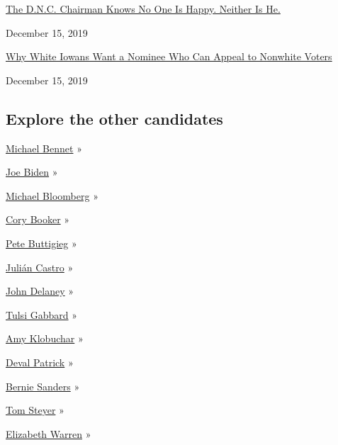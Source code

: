 \href{https://www.nytimes.com/2019/12/15/us/politics/democrats-2020-tom-perez.html}{The
D.N.C. Chairman Knows No One Is Happy. Neither Is He.}

December 15, 2019

\href{https://www.nytimes.com/2019/12/15/us/politics/iowa-2020-candidates.html}{Why
White Iowans Want a Nominee Who Can Appeal to Nonwhite Voters}

December 15, 2019

\hypertarget{explore-the-other-candidates}{%
\subsection{Explore the other
candidates}\label{explore-the-other-candidates}}

\href{https://www.nytimes.com/interactive/2020/us/elections/michael-bennet.html}{Michael
Bennet} »

\href{https://www.nytimes.com/interactive/2020/us/elections/joe-biden.html}{Joe
Biden} »

\href{https://www.nytimes.com/interactive/2020/us/elections/michael-bloomberg.html}{Michael
Bloomberg} »

\href{https://www.nytimes.com/interactive/2020/us/elections/cory-booker.html}{Cory
Booker} »

\href{https://www.nytimes.com/interactive/2020/us/elections/pete-buttigieg.html}{Pete
Buttigieg} »

\href{https://www.nytimes.com/interactive/2020/us/elections/julian-castro.html}{Julián
Castro} »

\href{https://www.nytimes.com/interactive/2020/us/elections/john-delaney.html}{John
Delaney} »

\href{https://www.nytimes.com/interactive/2020/us/elections/tulsi-gabbard.html}{Tulsi
Gabbard} »

\href{https://www.nytimes.com/interactive/2020/us/elections/amy-klobuchar.html}{Amy
Klobuchar} »

\href{https://www.nytimes.com/interactive/2020/us/elections/deval-patrick.html}{Deval
Patrick} »

\href{https://www.nytimes.com/interactive/2020/us/elections/bernie-sanders.html}{Bernie
Sanders} »

\href{https://www.nytimes.com/interactive/2020/us/elections/tom-steyer.html}{Tom
Steyer} »

\href{https://www.nytimes.com/interactive/2020/us/elections/elizabeth-warren.html}{Elizabeth
Warren} »

